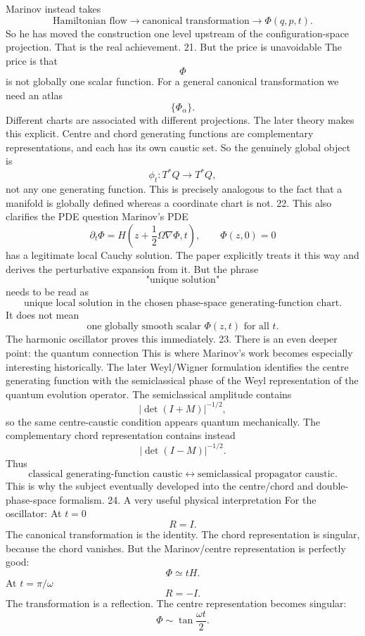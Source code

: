 Marinov instead takes
$$ \boxed{ \text{Hamiltonian flow} \rightarrow \text{canonical transformation} \rightarrow \Phi(q,p,t). } $$
So he has moved the construction one level upstream of the configuration-space projection.
That is the real achievement.
21. But the price is unavoidable
The price is that
$$ \Phi $$
is not globally one scalar function.
For a general canonical transformation we need an atlas
$$ \{\Phi_\alpha\}. $$
Different charts are associated with different projections.
The later theory makes this explicit. Centre and chord generating functions are complementary representations, and each has its own caustic set.
So the genuinely global object is
$$ \boxed{\phi_t:T^*Q\rightarrow T^*Q,} $$
not any one generating function.
This is precisely analogous to the fact that a manifold is globally defined whereas a coordinate chart is not.
22. This also clarifies the PDE question
Marinov's PDE
$$ \partial_t\Phi = H\!\left( z+\frac12\Omega\nabla\Phi,t \right), \qquad \Phi(z,0)=0 $$
has a legitimate local Cauchy solution. The paper explicitly treats it this way and derives the perturbative expansion from it.
But the phrase
$$ \boxed{\text{"unique solution"}} $$
needs to be read as
$$ \boxed{ \text{unique local solution in the chosen phase-space generating-function chart}. } $$
It does not mean
$$ \boxed{ \text{one globally smooth scalar }\Phi(z,t) \text{ for all }t. } $$
The harmonic oscillator proves this immediately.
23. There is an even deeper point: the quantum connection
This is where Marinov's work becomes especially interesting historically.
The later Weyl/Wigner formulation identifies the centre generating function with the semiclassical phase of the Weyl representation of the quantum evolution operator. The semiclassical amplitude contains
$$ |\det(I+M)|^{-1/2}, $$
so the same centre-caustic condition appears quantum mechanically.
The complementary chord representation contains instead
$$ |\det(I-M)|^{-1/2}. $$
Thus
$$ \boxed{ \text{classical generating-function caustic} \longleftrightarrow \text{semiclassical propagator caustic}. } $$
This is why the subject eventually developed into the centre/chord and double-phase-space formalism.
24. A very useful physical interpretation
For the oscillator:
At \(t=0\)
$$ R=I. $$
The canonical transformation is the identity.
The chord representation is singular, because the chord vanishes.
But the Marinov/centre representation is perfectly good:
$$ \Phi\simeq tH. $$
At \(t=\pi/\omega\)
$$ R=-I. $$
The transformation is a reflection.
The centre representation becomes singular:
$$ \Phi\sim\tan\frac{\omega t}{2}. $$
